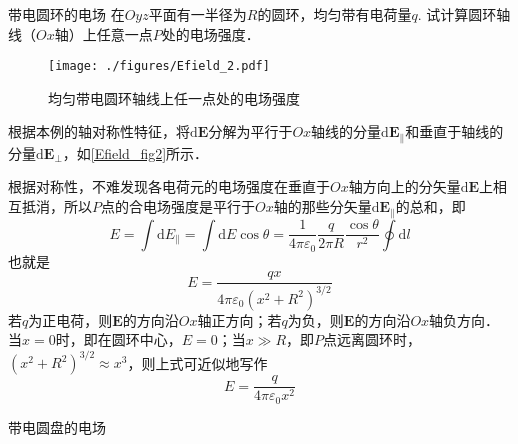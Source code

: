 \begin{example}{带电圆环的电场}\label{Efield_ex2}
在$Oyz $平面有一半径为$R $的圆环，均匀带有电荷量$q$. 试计算圆环轴线（$Ox $轴）上任意一点$P $处的电场强度．
\begin{figure}[ht]
\centering
\texttt{[image: ./figures/Efield\_2.pdf]}
\caption{均匀带电圆环轴线上任一点处的电场强度} \label{Efield_fig2}
\end{figure}

根据本例的轴对称性特征，将$\mathrm d\mathbf E$分解为平行于$Ox $轴线的分量$\mathrm d\mathbf E_\parallel$和垂直于轴线的分量$\mathrm d\mathbf E_\perp$，如\autoref{Efield_fig2}所示．

根据对称性，不难发现各电荷元的电场强度在垂直于$Ox $轴方向上的分矢量$\mathrm d\mathbf E$上相互抵消，所以$P $点的合电场强度是平行于$Ox $轴的那些分矢量$\mathrm d\mathbf E_\parallel$的总和，即
\begin{equation}
E=\int \mathrm{d} E_\parallel=\int \mathrm{d} E \cos \theta=\frac{1}{4 \pi \varepsilon_{0}} \frac{q}{2 \pi R} \frac{\cos \theta}{r^{2}} \oint \mathrm{d} l
\end{equation}
也就是
\begin{equation} \label{Efield_eq6}
E=\frac{q x}{4 \pi \varepsilon_{0}\left(x^{2}+R^{2}\right)^{3 / 2}} 
\end{equation}
若$q $为正电荷，则$\mathbf E $的方向沿$Ox $轴正方向；若$q$为负，则$\mathbf E $的方向沿$Ox $轴负方向．当$x=0$时，即在圆环中心，$E=0$；当$x\gg R$，即$P $点远离圆环时，$\left(x^{2}+R^{2}\right)^{3 / 2} \approx x^{3}$，则上式可近似地写作
\begin{equation}
E=\frac{q}{4 \pi \varepsilon_{0} x^{2}}
\end{equation}
\end{example}

 
\begin{example}{带电圆盘的电场}\label{Efield_ex3}

\end{example}
